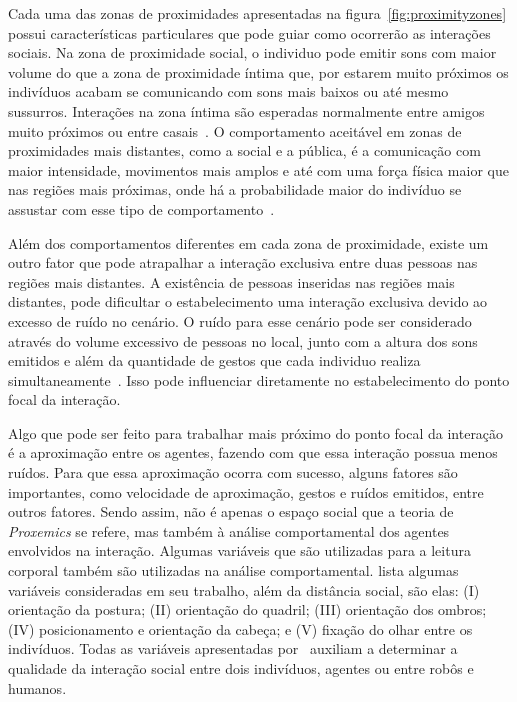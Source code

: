 Cada uma das zonas de proximidades apresentadas na figura~\ref{fig:proximityzones} possui características particulares que pode guiar como ocorrerão as interações sociais. Na zona de proximidade social, o individuo pode emitir sons com maior volume do que a zona de proximidade íntima que, por estarem muito próximos os indivíduos acabam se comunicando com sons mais baixos ou até mesmo sussurros. Interações na zona íntima são esperadas normalmente entre amigos muito próximos ou entre casais~\cite{hall:1969, argyle:1988}. O comportamento aceitável em zonas de proximidades mais distantes, como a social e a pública, é a comunicação com maior intensidade, movimentos mais amplos e até com uma força física maior que nas regiões mais próximas, onde há a probabilidade maior do indivíduo se assustar com esse tipo de comportamento~\cite{henkel:2014}.

Além dos comportamentos diferentes em cada zona de proximidade, existe um outro fator que pode atrapalhar a interação exclusiva entre duas pessoas nas regiões mais distantes. A existência de pessoas inseridas nas regiões mais distantes, pode dificultar o estabelecimento uma interação exclusiva devido ao excesso de ruído no cenário. O ruído para esse cenário pode ser considerado através do volume excessivo de pessoas no local, junto com a altura dos sons emitidos e além da quantidade de gestos que cada individuo realiza simultaneamente~\cite{walters:2009, henkel:2014}. Isso pode influenciar diretamente no estabelecimento do ponto focal da interação.

Algo que pode ser feito para trabalhar mais próximo do ponto focal da interação é a aproximação entre os agentes, fazendo com que essa interação possua menos ruídos. Para que essa aproximação ocorra com sucesso, alguns fatores são importantes, como velocidade de aproximação, gestos e ruídos emitidos, entre outros fatores. Sendo assim, não é apenas o espaço social que a teoria de \emph{Proxemics} se refere, mas também à análise comportamental dos agentes envolvidos na interação. Algumas variáveis que são utilizadas para a leitura corporal também são utilizadas na análise comportamental.  lista algumas variáveis consideradas em seu trabalho, além da distância social, são elas: (I) orientação da postura; (II) orientação do quadril; (III) orientação dos ombros; (IV) posicionamento e orientação da cabeça; e (V) fixação do olhar entre os indivíduos. Todas as variáveis apresentadas por~ auxiliam a determinar a qualidade da interação social entre dois indivíduos, agentes ou entre robôs e humanos.

